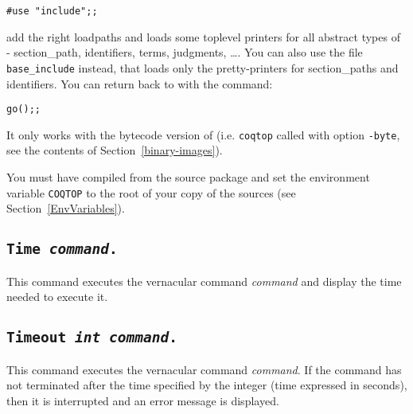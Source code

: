 \begin{flushleft}
\begin{verbatim}
#use "include";;
\end{verbatim}
\end{flushleft}

\noindent add the right loadpaths and loads some toplevel printers for
all abstract types of \Coq - section\_path, identifiers, terms, judgments,
\dots. You can also use the file \texttt{base\_include} instead,
that loads only the pretty-printers for section\_paths and
identifiers.
You can return back to \Coq{} with the command: 

\begin{flushleft}
\begin{verbatim}
go();;
\end{verbatim}
\end{flushleft}

\begin{Warnings}
\item It only works with the bytecode version of {\Coq} (i.e. {\tt coqtop} called with option {\tt -byte}, see the contents of Section~\ref{binary-images}).
\item You must have compiled {\Coq} from the source package and set the
  environment variable \texttt{COQTOP} to the root of your copy of the sources (see Section~\ref{EnvVariables}).
\end{Warnings}

\subsection[\tt Time \textrm{\textsl{command}}.]{\tt Time \textrm{\textsl{command}}.
\label{time}}
This command executes the vernacular command \textrm{\textsl{command}}
and display the time needed to execute it.


\subsection[\tt Timeout \textrm{\textsl{int}} \textrm{\textsl{command}}.]{\tt Timeout \textrm{\textsl{int}} \textrm{\textsl{command}}.
\label{timeout}}

This command executes the vernacular command \textrm{\textsl{command}}. If
the command has not terminated after the time specified by the integer
(time expressed in seconds), then it is interrupted and an error message
is displayed.

